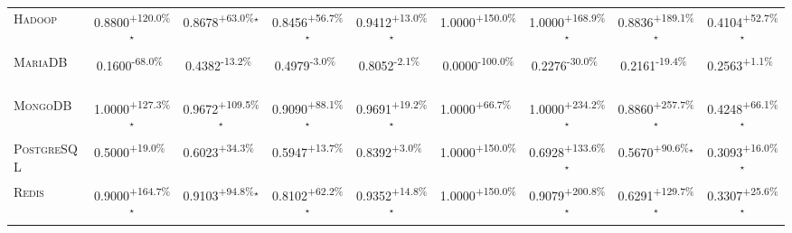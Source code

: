 \begin{table}[htbp]
\begin{tabular}{l|cccc|cccc}
\textsc{Hadoop} & \cellcolor{green!30}0.8800\textsuperscript{+120.0\%}$^\star$ & \cellcolor{green!30}0.8678\textsuperscript{+63.0\%}$^\star$ & \cellcolor{green!30}0.8456\textsuperscript{+56.7\%}$^\star$ & \cellcolor{green!30}0.9412\textsuperscript{+13.0\%}$^\star$ & \cellcolor{green!30}1.0000\textsuperscript{+150.0\%}$^{\,\,\,}$ & \cellcolor{green!30}1.0000\textsuperscript{+168.9\%}$^\star$ & \cellcolor{green!30}0.8836\textsuperscript{+189.1\%}$^\star$ & \cellcolor{green!30}0.4104\textsuperscript{+52.7\%}$^\star$ \\
\textsc{MariaDB} & \cellcolor{red!30}0.1600\textsuperscript{-68.0\%}$^{\,\,\,}$ & \cellcolor{red!30}0.4382\textsuperscript{-13.2\%}$^{\,\,\,}$ & \cellcolor{red!30}0.4979\textsuperscript{-3.0\%}$^{\,\,\,}$ & \cellcolor{red!30}0.8052\textsuperscript{-2.1\%}$^{\,\,\,}$ & \cellcolor{red!30}0.0000\textsuperscript{-100.0\%}$^{\,\,\,}$ & \cellcolor{red!30}0.2276\textsuperscript{-30.0\%}$^{\,\,\,}$ & \cellcolor{red!30}0.2161\textsuperscript{-19.4\%}$^{\,\,\,}$ & \cellcolor{green!30}0.2563\textsuperscript{+1.1\%}$^{\,\,\,}$ \\
\textsc{MongoDB} & \cellcolor{green!30}1.0000\textsuperscript{+127.3\%}$^\star$ & \cellcolor{green!30}0.9672\textsuperscript{+109.5\%}$^\star$ & \cellcolor{green!30}0.9090\textsuperscript{+88.1\%}$^\star$ & \cellcolor{green!30}0.9691\textsuperscript{+19.2\%}$^\star$ & \cellcolor{green!30}1.0000\textsuperscript{+66.7\%}$^{\,\,\,}$ & \cellcolor{green!30}1.0000\textsuperscript{+234.2\%}$^\star$ & \cellcolor{green!30}0.8860\textsuperscript{+257.7\%}$^\star$ & \cellcolor{green!30}0.4248\textsuperscript{+66.1\%}$^\star$ \\
\textsc{PostgreSQL} & \cellcolor{green!30}0.5000\textsuperscript{+19.0\%}$^{\,\,\,}$ & \cellcolor{green!30}0.6023\textsuperscript{+34.3\%}$^{\,\,\,}$ & \cellcolor{green!30}0.5947\textsuperscript{+13.7\%}$^{\,\,\,}$ & \cellcolor{green!30}0.8392\textsuperscript{+3.0\%}$^{\,\,\,}$ & \cellcolor{green!30}1.0000\textsuperscript{+150.0\%}$^{\,\,\,}$ & \cellcolor{green!30}0.6928\textsuperscript{+133.6\%}$^\star$ & \cellcolor{green!30}0.5670\textsuperscript{+90.6\%}$^\star$ & \cellcolor{green!30}0.3093\textsuperscript{+16.0\%}$^\star$ \\
\textsc{Redis} & \cellcolor{green!30}0.9000\textsuperscript{+164.7\%}$^\star$ & \cellcolor{green!30}0.9103\textsuperscript{+94.8\%}$^\star$ & \cellcolor{green!30}0.8102\textsuperscript{+62.2\%}$^\star$ & \cellcolor{green!30}0.9352\textsuperscript{+14.8\%}$^\star$ & \cellcolor{green!30}1.0000\textsuperscript{+150.0\%}$^{\,\,\,}$ & \cellcolor{green!30}0.9079\textsuperscript{+200.8\%}$^\star$ & \cellcolor{green!30}0.6291\textsuperscript{+129.7\%}$^\star$ & \cellcolor{green!30}0.3307\textsuperscript{+25.6\%}$^\star$ \\

\end{tabular}
\end{table}
